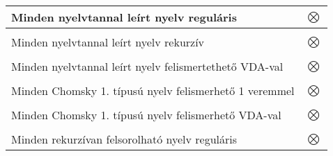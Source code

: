 \documentclass[12pt,margin=0px]{article}
\begin{document}
\begin{tabular}{l|c}
        Minden nyelvtannal leírt nyelv reguláris & $\bigotimes$ \\ \hline \\
        Minden nyelvtannal leírt nyelv rekurzív & $\bigotimes$ \\ \hline \\
        Minden nyelvtannal leírt nyelv felismertethető VDA-val & $\bigotimes$ \\ \hline \\
        Minden Chomsky 1. típusú nyelv felismerhető 1 veremmel & $\bigotimes$ \\ \hline \\
        Minden Chomsky 1. típusú nyelv felismerhető VDA-val & $\bigotimes$ \\ \hline \\
        Minden rekurzívan felsorolható nyelv reguláris & $\bigotimes$ \\ \hline
    \end{tabular}
\end{document}
